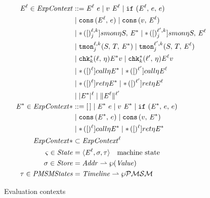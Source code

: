 \documentclass[preprint,onecolumn,9pt]{sigplanconf} %
\begin{document}
\begin{figure}
\begin{align*}
\mathit{E}^{\ell} \in \mathit{ExpContext} &::=
      \mathit{E}^{\ell}\ e
 \mid v\ \mathit{E}^{\ell}
 \mid {\tt if}{\ }({\mathit{E}^{\ell},\,e,\,e}) \\
&\mid {\tt \tt cons}{\,}({\mathit{E}^{\ell},\, e})
 \mid {\tt \tt cons}{\,}({v,\, \mathit{E}^{\ell}}) \\
&\mid {\tt *}{\,}({[})^{\ell,k}_{j}]{smon}{\eta}{S,\, \mathit{E}^{*}}
 \mid {\tt *}{\,}({[})^{\ell^\prime,k}_{j}]{smon}{\eta}{S,\, \mathit{E}^{\ell}} \\
&\mid {\tt tmon}{^{\ell,k}_{j}}({S,\,T,\,\mathit{E}^{*}})
 \mid {\tt tmon}{^{\ell^\prime,k}_{j}}({S,\,T,\,\mathit{E}^{\ell}}) \\
&\mid {\tt chk}{^{*}_{k}}({\ell,\, \eta}){\mathit{E}^{*}}{v}
 \mid {\tt chk}{^{*}_{k}}({\ell^\prime,\, \eta}){\mathit{E}^{\ell}}{v} \\
&\mid {\tt *}{\,}({[})^{\ell}]{call}{\eta}{\mathit{E}^{*}}
 \mid {\tt *}{\,}({[})^{\ell^\prime}]{call}{\eta}{\mathit{E}^{\ell}} \\
&\mid {\tt *}{\,}({[})^{\ell}]{ret}{\eta}{\mathit{E}^{*}}
 \mid {\tt *}{\,}({[})^{\ell^\prime}]{ret}{\eta}{\mathit{E}^{\ell}} \\
&\mid \lvert\mathit{E}^{*}\rvert^{\ell}
 \mid \lVert\mathit{E}^{\ell}\rVert^{\ell^\prime}
\\
\mathit{E}^{*} \in \mathit{ExpContext}* &::=
      [\,]
 \mid \mathit{E}^{*}\ e
 \mid v\ \mathit{E}^{*}
 \mid {\tt if}{\ }({\mathit{E}^{*},\,e,\,e}) \\
&\mid {\tt \tt cons}{\,}({\mathit{E}^{*},\, e})
 \mid {\tt \tt cons}{\,}({v,\, \mathit{E}^{*}}) \\
&\mid {\tt *}{\,}({[})^{\ell}]{call}{\eta}{\mathit{E}^{*}}
 \mid {\tt *}{\,}({[})^{\ell}]{ret}{\eta}{\mathit{E}^{*}} \\
\mathit{ExpContext}* &\subset \mathit{ExpContext}^\ell
\\
\varsigma \in \mathit{State} &= \langle\mathit{E}^{\ell}, \sigma, \tau\rangle \quad\text{machine state}
\\
\sigma \in \mathit{Store} &= \mathit{Addr} \mathrel{\rightharpoonup} \wp(\mathit{Value})
\\
\tau \in \mathit{PMSMStates} &= \mathit{Timeline} \mathrel{\rightharpoonup} \wp{{\mathcal{PMSM}}}
\end{align*}
\caption{Evaluation contexts}
\label{fig:ctx}
\end{figure}
\end{document}

